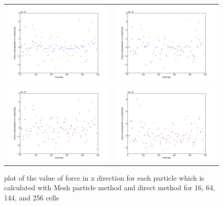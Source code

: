 \documentclass[10pt]{article}
\begin{document}
\begin{figure}[htp]
  \centering
  \caption{\label{fig:CompareForce}plot of the value of force in x direction for each particle which is calculated with Mesh particle method and direct method for 16, 64, 144, and 256 cells}
  \begin{tabular}{cc}
    \includegraphics[width=75mm]{Plots/MPCompare/Compare_4.pdf}&
    \includegraphics[width=75mm]{Plots/MPCompare/Compare_8.pdf}\\
    \includegraphics[width=75mm]{Plots/MPCompare/Compare_12.pdf}&
    \includegraphics[width=75mm]{Plots/MPCompare/Compare_16.pdf}\\
  \end{tabular}
\end{figure}
\end{document}
